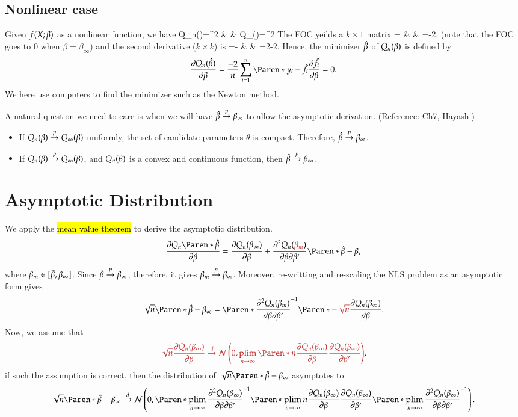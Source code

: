\documentclass{Theme}
\begin{document}
\subsection{Nonlinear case}
Given $f(X;\beta)$ as a nonlinear function, we have 
\barc
Q_n(\be)=\frn\sumn{}^2 & \pto &
Q_\infty(\beta)=^2 
\earc
The FOC yeilds a $k\times1$ matrix 
\barc 
  =\sumn{}
  & \pto &
  =-2,
\earc 
(note that the FOC goes to 0 when $\beta=\beta_\infty$)
and the second derivative ($k\times k$) is 
\barc 
{}=\sumn{}-\sumn{}
& \pto & 
=2-2. 
\earc
Hence, the minimizer $\hat{\beta}$ of $Q_n(\beta)$ is defined by 
\[
  \pdv{Q_n(\hat{\be})}{\be}=\frac{-2}{n}\sumn\br{y_i-\hat{f}_i}\pdv{\hat{f}_i}{\be}=0.
\]
We here use computers to find the minimizer such as the Newton method.

A natural question we need to care is when we will have $\hat{\beta}\stackrel{p}{\to}\beta_\infty$ to allow the 
asymptotic derivation. (Reference: Ch7, Hayashi)
\begin{itemize}
  \item If $Q_n(\beta)\stackrel{p}{\to} Q_\infty(\beta)$ uniformly, the set of candidate parameters $\theta$ 
    is compact. Therefore, $\hat{\beta}\stackrel{p}{\to}\beta_\infty$.
  \item If $Q_n(\beta)\stackrel{p}{\to} Q_\infty(\beta)$, and $Q_n(\beta)$ is a convex and continuous function, 
    then $\hat{\beta}\stackrel{p}{\to}\beta_\infty$.
\end{itemize}

\section{Asymptotic Distribution}
We apply the \hl{mean value theorem} to derive the asymptotic distribution.
\[
  \pdv{Q_n\br{\hat{\beta}}}{\beta}=\pdv{Q_n(\beta_\infty)}{\beta}
  +\ppdv{Q_n(\hl{\beta_m})}{\beta}{\beta'}\br{\hat{\be}-\beta},
\]
where $\beta_m\in[\hat{\beta},\beta_\infty]$. Since $\hat{\beta}\stackrel{p}{\to}\beta_\infty$,
therefore, it gives $\beta_m\stackrel{p}{\to}\beta_\infty$.
Moreover, re-writting and re-scaling the NLS problem as an asymptotic form gives 
\[
  \sqrt{n}\br{\hat{\be}-\be_\infty}=\br{\ppdv{Q_n(\be_m)}{\beta}{\beta'}}\inv 
  \br{\hl{-\sqrt{n}}\pdv{Q_n(\be_\infty)}{\be}}.
\]
Now, we assume that  
\[
  \hl{\sqrt{n}\pdv{Q_n(\be_\infty)}{\be}\dto\nor{0,\plinf\br{n\pdv{Q_n(\be_\infty)}{\beta}\pdv{Q_n(\be_\infty)}{\be'}}}},
\]
if such the assumption is correct,
then the distribution of $\sqrt{n}\br{\hat{\be}-\be_\infty}$ asymptotes to 
\[
  \sqrt{n}\br{\hat{\beta}-\beta_\infty}\dto 
  \nor{0,\br{\plinf\ppdv{Q_n(\be_\infty)}{\beta}{\beta'}}\inv\br{\plinf n\pdv{Q_n(\be_\infty)}{\be}\pdv{Q_n(\be_\infty)}{\be'}}\br{\plinf\ppdv{Q_n(\be_\infty)}{\beta}{\beta'}}\inv}.
\]
\end{document}
